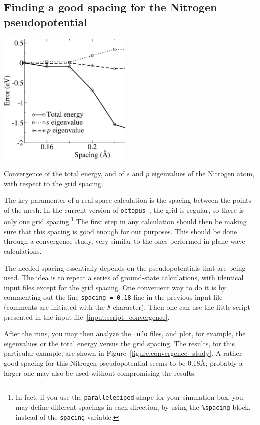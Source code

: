 \documentclass[10pt,a4paper,twoside]{article}
\newcommand{\octopus}{{\tt octopus}\ }
\begin{document}
\subsection{Finding a good spacing for the Nitrogen pseudopotential}

\begin{floatingfigure}{0.5\textwidth}
\includegraphics[width=0.48\textwidth]{img/spacing.eps}
\caption{Convergence of the total energy, and of $s$ and $p$ eigenvalues of
the Nitrogen atom, with respect to the grid spacing.
\label{figure:convergence_study}
}
\end{floatingfigure}
The key paramenter of a real-space calculation is the spacing between the points
of the mesh. In the current version of \octopus, the grid is regular, so there is
only one grid spacing.\footnote{
In fact, if you use the {\tt parallelepiped} shape for your simulation box, you may
define different spacings in each direction, by using the {\tt \%spacing} block, instead
of the {\tt spacing} variable.
}
The first step in any calculation should then be making sure that this spacing is
good enough for our purposes. This should be done through a convergence study, very
similar to the ones performed in plane-wave calculations.

The needed spacing essentially depends on the pseudopotentials that are being
used. The idea is to repeat a series of ground-state calculations, with identical input files
except for the grid spacing. One convenient way to do it is by commenting
out the line {\tt spacing = 0.18} line in the previous input file (comments
are initiated with the {\tt \#} character). Then one can use the little script
presented in the input file~\ref{input:script_convergence}.

After the runs, you may then analyze the {\tt info} files, and plot, for example,
the eigenvalues or the total energy versus the grid spacing. The results, for this
particular example, are shown in Figure~\ref{figure:convergence_study}. A rather good spacing
for this Nitrogen pseudopotential seems to be 0.18\AA; probably a larger one may also
be used without compromising the results.
\end{document}
